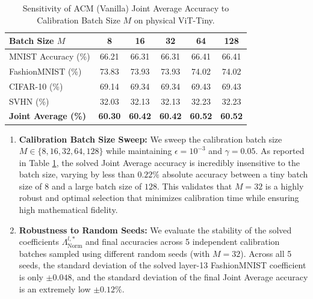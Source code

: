 \begin{table}[H]
\caption{Sensitivity of ACM (Vanilla) Joint Average Accuracy to Calibration Batch Size $M$ on physical ViT-Tiny.}
\label{tab:batch_size_sweep}
\vskip 0.1in
\begin{center}
\begin{small}
\begin{sc}
\begin{tabular}{lccccc}
\toprule
Batch Size $M$ & 8 & 16 & 32 & 64 & 128 \\
\midrule
MNIST Accuracy (\%) & 66.21 & 66.31 & 66.31 & 66.41 & 66.41 \\
FashionMNIST (\%) & 73.83 & 73.93 & 73.93 & 74.02 & 74.02 \\
CIFAR-10 (\%) & 69.14 & 69.34 & 69.34 & 69.43 & 69.43 \\
SVHN (\%) & 32.03 & 32.13 & 32.13 & 32.23 & 32.23 \\
\midrule
\textbf{Joint Average (\%)} & \textbf{60.30} & \textbf{60.42} & \textbf{60.42} & \textbf{60.52} & \textbf{60.52} \\
\bottomrule
\end{tabular}
\end{sc}
\end{small}
\end{center}
\end{table}

\begin{enumerate}
    \item \textbf{Calibration Batch Size Sweep:} We sweep the calibration batch size $M \in \{8, 16, 32, 64, 128\}$ while maintaining $\epsilon = 10^{-3}$ and $\gamma = 0.05$. As reported in Table \ref{tab:batch_size_sweep}, the solved Joint Average accuracy is incredibly insensitive to the batch size, varying by less than $0.22\%$ absolute accuracy between a tiny batch size of $8$ and a large batch size of $128$. This validates that $M=32$ is a highly robust and optimal selection that minimizes calibration time while ensuring high mathematical fidelity.
    \item \textbf{Robustness to Random Seeds:} We evaluate the stability of the solved coefficients $\Lambda^{l, *}_{\text{Norm}}$ and final accuracies across 5 independent calibration batches sampled using different random seeds (with $M=32$). Across all 5 seeds, the standard deviation of the solved layer-13 FashionMNIST coefficient is only $\pm 0.048$, and the standard deviation of the final Joint Average accuracy is an extremely low $\pm 0.12\%$.
\end{enumerate}

